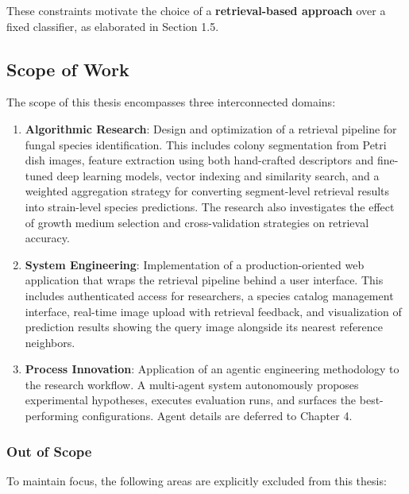 These constraints motivate the choice of a \textbf{retrieval-based approach} over a fixed classifier, as elaborated in Section 1.5.

\subsection{Scope of Work}\label{scope-of-work}

The scope of this thesis encompasses three interconnected domains:

\begin{enumerate}
\def\labelenumi{\arabic{enumi}.}
\item
  \textbf{Algorithmic Research}: Design and optimization of a retrieval pipeline for fungal species identification. This includes colony segmentation from Petri dish images, feature extraction using both hand-crafted descriptors and fine-tuned deep learning models, vector indexing and similarity search, and a weighted aggregation strategy for converting segment-level retrieval results into strain-level species predictions. The research also investigates the effect of growth medium selection and cross-validation strategies on retrieval accuracy.
\item
  \textbf{System Engineering}: Implementation of a production-oriented web application that wraps the retrieval pipeline behind a user interface. This includes authenticated access for researchers, a species catalog management interface, real-time image upload with retrieval feedback, and visualization of prediction results showing the query image alongside its nearest reference neighbors.
\item
  \textbf{Process Innovation}: Application of an agentic engineering methodology to the research workflow. A multi-agent system autonomously proposes experimental hypotheses, executes evaluation runs, and surfaces the best-performing configurations. Agent details are deferred to Chapter 4.
\end{enumerate}

\subsubsection{Out of Scope}\label{out-of-scope}

To maintain focus, the following areas are explicitly excluded from this thesis:

